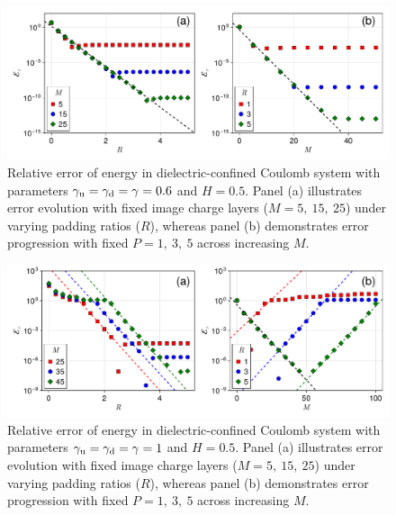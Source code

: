 \begin{figure}[htbp]
    \centering
    \includegraphics[width=0.98\linewidth]{figs/error_icm_pad_gamma_0.6.pdf}
    \caption{Relative error of energy in dielectric-confined Coulomb system with parameters $\gamma_{\text{u}} = \gamma_{\text{d}} = \gamma = 0.6$ and $H = 0.5$. Panel (a) illustrates error evolution with fixed image charge layers ($M = 5,~15,~25$) under varying padding ratios ($R$), whereas panel (b) demonstrates error progression with fixed $P = 1,~3,~5$ across increasing $M$.}
    \label{fig:error_icm_pad_gamma_0.6}
\end{figure}

\begin{figure}[htbp]
    \centering
    \includegraphics[width=0.98\linewidth]{figs/error_icm_pad_gamma_1.pdf}
    \caption{Relative error of energy in dielectric-confined Coulomb system with parameters $\gamma_{\text{u}} = \gamma_{\text{d}} = \gamma = 1$ and $H = 0.5$. Panel (a) illustrates error evolution with fixed image charge layers ($M = 5,~15,~25$) under varying padding ratios ($R$), whereas panel (b) demonstrates error progression with fixed $P = 1,~3,~5$ across increasing $M$.}
    \label{fig:error_icm_pad_gamma_1}
\end{figure}


